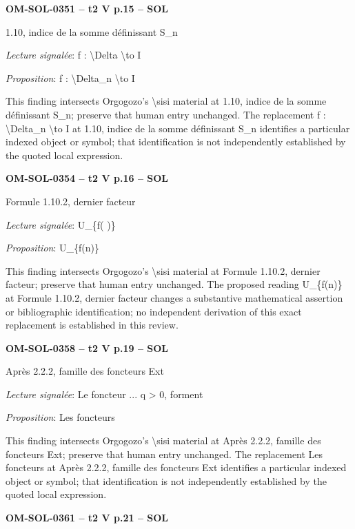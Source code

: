 \par\noindent\textbf{OM-SOL-0351 -- t2 V p.15 -- SOL}\par
1.10, indice de la somme définissant S\_n\par
\emph{Lecture signalée}: f : \textbackslash{}Delta \textbackslash{}to I\par
\emph{Proposition}: f : \textbackslash{}Delta\_n \textbackslash{}to I\par
This finding intersects Orgogozo's \textbackslash{}sisi material at 1.10, indice de la somme définissant S\_n; preserve that human entry unchanged. The replacement f : \textbackslash{}Delta\_n \textbackslash{}to I at 1.10, indice de la somme définissant S\_n identifies a particular indexed object or symbol; that identification is not independently established by the quoted local expression.\par
\par\noindent\textbf{OM-SOL-0354 -- t2 V p.16 -- SOL}\par
Formule 1.10.2, dernier facteur\par
\emph{Lecture signalée}: U\_\{f( )\}\par
\emph{Proposition}: U\_\{f(n)\}\par
This finding intersects Orgogozo's \textbackslash{}sisi material at Formule 1.10.2, dernier facteur; preserve that human entry unchanged. The proposed reading U\_\{f(n)\} at Formule 1.10.2, dernier facteur changes a substantive mathematical assertion or bibliographic identification; no independent derivation of this exact replacement is established in this review.\par
\par\noindent\textbf{OM-SOL-0358 -- t2 V p.19 -- SOL}\par
Après 2.2.2, famille des foncteurs Ext\par
\emph{Lecture signalée}: Le foncteur ... q > 0, forment\par
\emph{Proposition}: Les foncteurs\par
This finding intersects Orgogozo's \textbackslash{}sisi material at Après 2.2.2, famille des foncteurs Ext; preserve that human entry unchanged. The replacement Les foncteurs at Après 2.2.2, famille des foncteurs Ext identifies a particular indexed object or symbol; that identification is not independently established by the quoted local expression.\par
\par\noindent\textbf{OM-SOL-0361 -- t2 V p.21 -- SOL}\par
